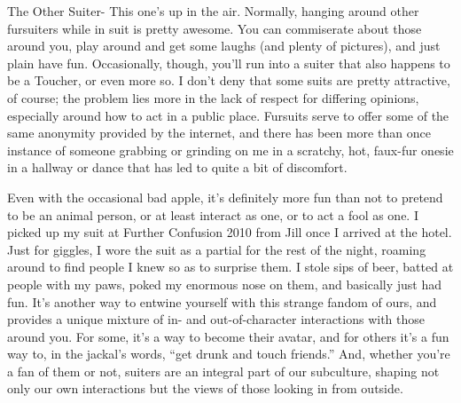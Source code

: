 The Other Suiter- This one's up in the air. Normally, hanging around other fursuiters while in suit is pretty awesome. You can commiserate about those around you, play around and get some laughs (and plenty of pictures), and just plain have fun. Occasionally, though, you'll run into a suiter that also happens to be a Toucher, or even more so. I don't deny that some suits are pretty attractive, of course; the problem lies more in the lack of respect for differing opinions, especially around how to act in a public place. Fursuits serve to offer some of the same anonymity provided by the internet, and there has been more than once instance of someone grabbing or grinding on me in a scratchy, hot, faux-fur onesie in a hallway or dance that has led to quite a bit of discomfort.

Even with the occasional bad apple, it's definitely more fun than not to pretend to be an animal person, or at least interact as one, or to act a fool as one. I picked up my suit at Further Confusion 2010 from Jill once I arrived at the hotel. Just for giggles, I wore the suit as a partial for the rest of the night, roaming around to find people I knew so as to surprise them. I stole sips of beer, batted at people with my paws, poked my enormous nose on them, and basically just had fun. It's another way to entwine yourself with this strange fandom of ours, and provides a unique mixture of in- and out-of-character interactions with those around you. For some, it's a way to become their avatar, and for others it's a fun way to, in the jackal's words, ``get drunk and touch friends.'' And, whether you're a fan of them or not, suiters are an integral part of our subculture, shaping not only our own interactions but the views of those looking in from outside.

